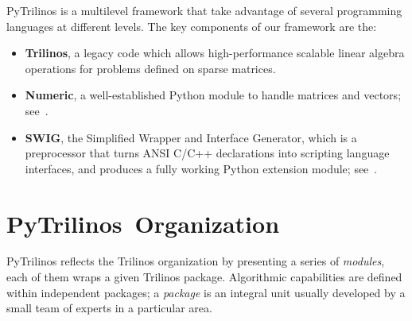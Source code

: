 \documentclass[10pt,relax]{SANDreport}
\newcommand{\PyTrilinos}{{PyTrilinos}}
\begin{document}
PyTrilinos is a multilevel framework that take advantage of several
programming languages at different levels. 
The key components of our framework are the:
\begin{itemize}
\item {\bf Trilinos}, a legacy code which allows high-performance scalable
linear algebra operations for problems defined on sparse matrices. 
\item {\bf Numeric}, a well-established Python module to handle matrices and
vectors; see~\cite{numeric}.
\item {\bf SWIG}, the Simplified Wrapper and Interface Generator, which
is a  preprocessor
that turns ANSI C/C++ declarations into scripting language interfaces, and
produces a fully working Python extension module; see~\cite{swig}.
\end{itemize}

\section{\PyTrilinos\ Organization}
\label{sec:organization}

PyTrilinos reflects the Trilinos organization by presenting
a series of {\sl modules}, each of them wraps a given Trilinos package.
Algorithmic capabilities are defined within independent packages; a {\sl
  package} is an integral unit usually developed by a small team of experts in
  a particular area. 
\end{document}
